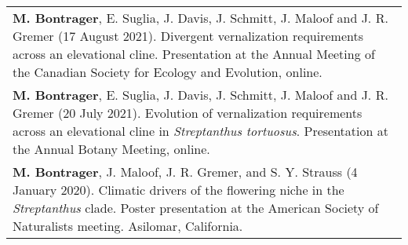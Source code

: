 \documentclass[letterpaper,11pt,oneside]{article}
\begin{document}
\def\arraystretch{1.4}
\noindent \begin{tabular}{@{} >{\raggedright\arraybackslash}p{17.2cm}}
\hangindent=5mm\textbf{M. Bontrager}, E. Suglia, J. Davis, J. Schmitt, J. Maloof and J. R. Gremer (17 August 2021). Divergent vernalization requirements across an elevational cline. Presentation at the Annual Meeting of the Canadian Society for Ecology and Evolution, online. \\
\hangindent=5mm\textbf{M. Bontrager}, E. Suglia, J. Davis, J. Schmitt, J. Maloof and J. R. Gremer (20 July 2021). Evolution of vernalization requirements across an elevational cline in \textit{Streptanthus tortuosus}. Presentation at the Annual Botany Meeting, online. \\
\hangindent=5mm\textbf{M. Bontrager}, J. Maloof, J. R. Gremer, and S. Y. Strauss (4 January 2020). Climatic drivers of the flowering niche in the \textit{Streptanthus} clade. Poster presentation at the American Society of Naturalists meeting. Asilomar, California. \\
\end{tabular}
\end{document}
